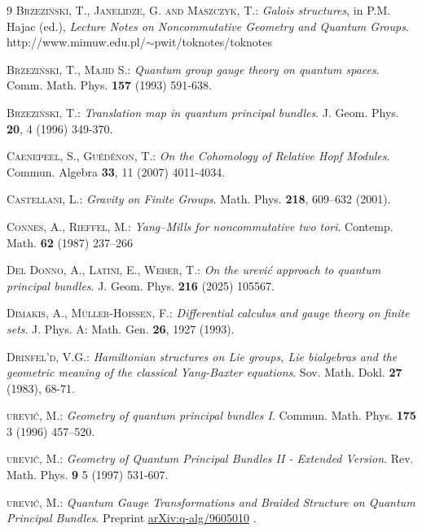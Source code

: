 \documentclass{article}
\theoremstyle{definition}
\begin{document}
{\begin{thebibliography}{9}
	\textsc{Brzezi\'nski, T., Janelidze, G. and Maszczyk, T.:}
	\emph{Galois structures}, in P.M. Hajac (ed.), {\it Lecture Notes on Noncommutative Geometry and Quantum	Groups}. http://www.mimuw.edu.pl/$\sim$pwit/toknotes/toknotes
	
	\textsc{Brzeziński, T., Majid S.:}
	\emph{Quantum group gauge theory on quantum spaces}. Comm. Math. Phys. \textbf{157} (1993)
	591-638.
	
	\textsc{{Brzezi\'nski}, T.:} \textit{Translation map in quantum principal bundles}.
	J. Geom. Phys. \textbf{20}, 4 (1996) 349-370.
	
	\textsc{Caenepeel, S., Gu\'ed\'enon, T.:} 
	\emph{On the Cohomology of Relative Hopf Modules}. 
	Commun. Algebra \textbf{33}, 11 (2007) 4011-4034.
	
	\textsc{Castellani, L.:}
	\textit{Gravity on Finite Groups}.
	Math. Phys. \textbf{218}, 609–632 (2001).
	
	\textsc{Connes, A., Rieffel, M.:}
	\textit{Yang–Mills for noncommutative two tori}. 
	Contemp. Math. \textbf{62} (1987) 237–266
	
	\textsc{Del Donno, A., Latini, E., Weber, T.:}
	\textit{On the \DJ ur\dj evi\'c approach to quantum principal bundles}.
	J. Geom. Phys. \textbf{216} (2025) 105567.
	
	\textsc{Dimakis, A., Müller-Hoissen, F.:}
	\textit{Differential calculus and gauge theory on finite sets}.
	J. Phys. A: Math. Gen. \textbf{26}, 1927 (1993).
	
	\textsc{Drinfel'd, V.G.:}
	\textit{Hamiltonian structures on Lie groups, Lie bialgebras and the geometric meaning of the classical Yang-Baxter equations}.
	Sov. Math. Dokl. \textbf{27} (1983), 68-71.
	
	\textsc{\DJ ur\dj evi\'c, M.:}
	\emph{Geometry of quantum principal bundles I}.
	Commun. Math. Phys. \textbf{175} 3 (1996) 457–520.
	
	\textsc{\DJ ur\dj evi\'c, M.:}
	\emph{Geometry of Quantum Principal Bundles II - Extended Version}.
	Rev. Math. Phys. \textbf{9} 5 (1997) 531-607.
	
	\textsc{\DJ ur\dj evi\'c, M.:} \textit{Quantum Gauge Transformations and Braided Structure on Quantum Principal Bundles}. Preprint \hyperlink{https://arxiv.org/abs/q-alg/9605010}{arXiv:q-alg/9605010} .
	

\end{thebibliography}}
\end{document}
